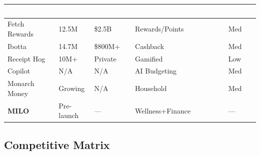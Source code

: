 \documentclass[11pt,a4paper]{article}
\begin{document}
\begin{center}
\begin{tabular}{L{3cm} R{1.8cm} R{1.8cm} L{3cm} C{1.5cm} C{1.5cm}}
    \toprule
    \textcolor{white}{\textbf{Competitor}} & \textcolor{white}{\textbf{Users}} & \textcolor{white}{\textbf{Valuation}} & \textcolor{white}{\textbf{Focus}} & \textcolor{white}{\textbf{Health}} & \textcolor{white}{\textbf{Threat}}\\
    \midrule
    Fetch Rewards & 12.5M & \$2.5B & Rewards/Points & \textcolor{milored}{} & Med\\
    Ibotta & 14.7M & \$800M+ & Cashback & \textcolor{milored}{} & Med\\
    Receipt Hog & 10M+ & Private & Gamified & \textcolor{milored}{} & Low\\
    Copilot & N/A & N/A & AI Budgeting & \textcolor{milored}{} & Med\\
    Monarch Money & Growing & N/A & Household & \textcolor{milored}{} & Med\\
    \textbf{MILO} & Pre-launch & --- & Wellness+Finance & \textcolor{milogreen}{} & ---\\
    \bottomrule
\end{tabular}
\end{center}

\subsection{Competitive Matrix}
\end{document}
